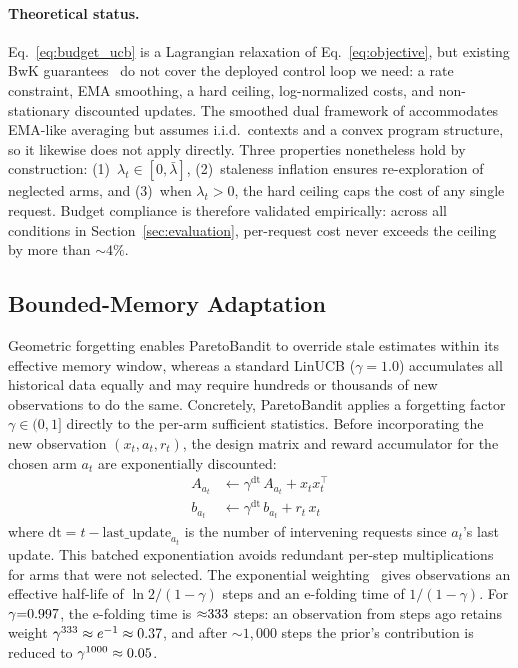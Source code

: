 \paragraph{Theoretical status.}
Eq.~\ref{eq:budget_ucb} is a Lagrangian relaxation of Eq.~\ref{eq:objective}, but existing BwK guarantees~\cite{badanidiyuru2013bwk} do not cover the deployed control loop we need: a rate constraint, EMA smoothing, a hard ceiling, log-normalized costs, and non-stationary discounted updates. The smoothed dual framework of \citet{balseiro2019learning} accommodates EMA-like averaging but assumes i.i.d.\ contexts and a convex program structure, so it likewise does not apply directly. Three properties nonetheless hold by construction: (1)~$\lambda_t \in [0, \bar\lambda]$, (2)~staleness inflation ensures re-exploration of neglected arms, and (3)~when $\lambda_t > 0$, the hard ceiling caps the cost of any single request. Budget compliance is therefore validated empirically: across all conditions in Section~\ref{sec:evaluation}, per-request cost never exceeds the ceiling by more than ${\sim}4\%$.

\subsection{Bounded-Memory Adaptation}
\label{sec:adaptive_learning}

Geometric forgetting enables ParetoBandit to override stale estimates within its effective memory window, whereas a standard LinUCB ($\gamma{=}1.0$) accumulates all historical data equally and may require hundreds or thousands of new observations to do the same. Concretely, ParetoBandit applies a forgetting factor $\gamma \in (0, 1]$ directly to the per-arm sufficient statistics. Before incorporating the new observation $(x_t, a_t, r_t)$, the design matrix and reward accumulator for the chosen arm $a_t$ are exponentially discounted:
\begin{align}
    A_{a_t} &\leftarrow \gamma^{\mathrm{dt}} \, A_{a_t} + x_t x_t^\top
    \label{eq:forget_A} \\
    b_{a_t} &\leftarrow \gamma^{\mathrm{dt}} \, b_{a_t} + r_t \, x_t
    \label{eq:forget_b}
\end{align}
where $\mathrm{dt} = t - \text{last\_update}_{a_t}$ is the number of intervening requests since $a_t$'s last update. This batched exponentiation avoids redundant per-step multiplications for arms that were not selected. The exponential weighting~\cite{garivier2011switching} gives observations an effective half-life of $\ln 2 / (1 - \gamma)$ steps and an e-folding time of $1 / (1 - \gamma)$. For $\gamma{=}0.997$, the e-folding time is ${\approx}333$ steps: an observation from \ppEffMemSteps{} steps ago retains weight $\gamma^{333} \approx e^{-1} \approx 0.37$, and after ${\sim}1{,}000$ steps the prior's contribution is reduced to $\gamma^{1000} \approx 0.05$.

